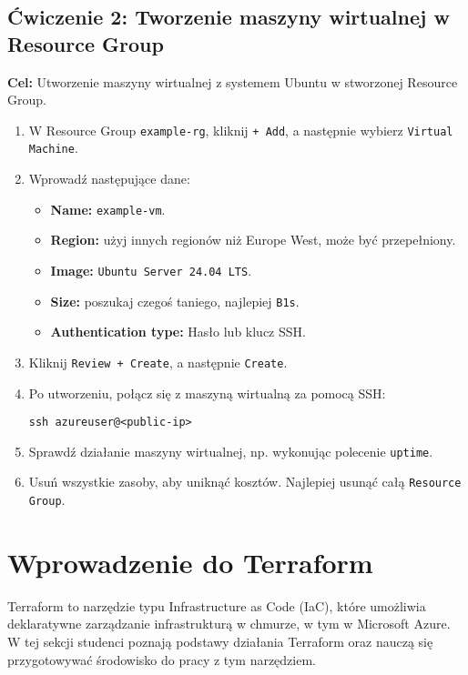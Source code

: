 \documentclass{article}
\begin{document}
\subsection{Ćwiczenie 2: Tworzenie maszyny wirtualnej w Resource Group}
\textbf{Cel:} Utworzenie maszyny wirtualnej z systemem Ubuntu w stworzonej Resource Group.

\begin{enumerate}
    \item W Resource Group \texttt{example-rg}, kliknij \texttt{+ Add}, a następnie wybierz \texttt{Virtual Machine}.
    \item Wprowadź następujące dane:
    \begin{itemize}
        \item \textbf{Name:} \texttt{example-vm}.
        \item \textbf{Region:} użyj innych regionów niż Europe West, może być przepełniony.
        \item \textbf{Image:} \texttt{Ubuntu Server 24.04 LTS}.
        \item \textbf{Size:} poszukaj czegoś taniego, najlepiej \texttt{B1s}.
        \item \textbf{Authentication type:} Hasło lub klucz SSH.
    \end{itemize}
    \item Kliknij \texttt{Review + Create}, a następnie \texttt{Create}.
    \item Po utworzeniu, połącz się z maszyną wirtualną za pomocą SSH:
    \begin{lstlisting}
ssh azureuser@<public-ip>
    \end{lstlisting}
    \item Sprawdź działanie maszyny wirtualnej, np. wykonując polecenie \texttt{uptime}.
    \item Usuń wszystkie zasoby, aby uniknąć kosztów. Najlepiej usunąć całą \texttt{Resource Group}.
\end{enumerate}


\section{Wprowadzenie do Terraform}
Terraform to narzędzie typu Infrastructure as Code (IaC), które umożliwia deklaratywne zarządzanie infrastrukturą w chmurze, w tym w Microsoft Azure. W tej sekcji studenci poznają podstawy działania Terraform oraz nauczą się przygotowywać środowisko do pracy z tym narzędziem.
\end{document}
